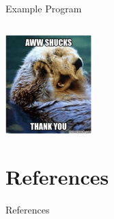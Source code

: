 		\begin{frame}{Example Program}
			\inputminted[frame=single,framesep=2pt,fontsize=\LARGE]{python3}{code-examples/example_io.py}
			\pause
			\centering
			\includegraphics[width=0.25\textwidth]{images/thanks.png}
		\end{frame}
		

	\section{References}
		\begin{frame}{References}
			
			
		\end{frame}
